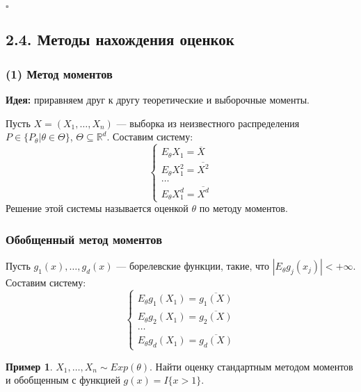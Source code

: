 \documentclass[12pt]{report}
\theoremstyle{definition}
\newtheorem{example}{Пример}
\begin{document}
$\square$

\subsection{2.4. Методы нахождения оценкок}

\subsubsection{(1) Метод моментов}
\textbf{Идея:} приравняем друг к другу теоретические и выборочные моменты.

Пусть $X = (X_1, \ldots, X_n)$ — выборка из неизвестного распределения $P \in \{P_\theta| \theta \in \Theta\}$, $\Theta \subseteq \mathbb{R}^d$. Составим систему:
$$\begin{cases}
    E_\theta X_1 = \overline{X}\\
    E_\theta X_1^2 = \overline{X^2}\\
    \dots\\
    E_\theta X_1^d = \overline{X^d}
\end{cases}$$
Решение этой системы называется оценкой $\theta$ по методу моментов.
\subsubsection{Обобщенный метод моментов}
Пусть $g_1(x),\ldots, g_d(x)$ — борелевские функции, такие, что $|E_\theta g_j(x_j)| < +\infty$. Составим систему:
$$\begin{cases}
    E_\theta g_1(X_1) = \overline{g_1(X)}\\
    E_\theta g_2(X_1) = \overline{g_2(X)}\\
    \dots\\
    E_\theta g_d(X_1) = \overline{g_d(X)}
\end{cases}$$
\begin{example}
	$X_1, \ldots, X_n \sim Exp(\theta)$. Найти оценку стандартным методом моментов и обобщенным с функцией $g(x) = I\{x > 1\}.$
\end{example}
\end{document}
